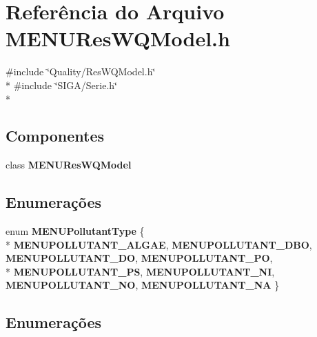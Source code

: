 \section{Referência do Arquivo M\+E\+N\+U\+Res\+W\+Q\+Model.\+h}
\label{_m_e_n_u_res_w_q_model_8h}
{\ttfamily \#include \char`\"{}Quality/\+Res\+W\+Q\+Model.\+h\char`\"{}}\\*
{\ttfamily \#include \char`\"{}S\+I\+G\+A/\+Serie.\+h\char`\"{}}\\*
\subsection*{Componentes}
\begin{DoxyCompactItemize}
\item 
class {\bf M\+E\+N\+U\+Res\+W\+Q\+Model}
\end{DoxyCompactItemize}
\subsection*{Enumerações}
\begin{DoxyCompactItemize}
\item 
enum {\bf M\+E\+N\+U\+Pollutant\+Type} \{ \\*
{\bf M\+E\+N\+U\+P\+O\+L\+L\+U\+T\+A\+N\+T\+\_\+\+A\+L\+G\+AE}, 
{\bf M\+E\+N\+U\+P\+O\+L\+L\+U\+T\+A\+N\+T\+\_\+\+D\+BO}, 
{\bf M\+E\+N\+U\+P\+O\+L\+L\+U\+T\+A\+N\+T\+\_\+\+DO}, 
{\bf M\+E\+N\+U\+P\+O\+L\+L\+U\+T\+A\+N\+T\+\_\+\+PO}, 
\\*
{\bf M\+E\+N\+U\+P\+O\+L\+L\+U\+T\+A\+N\+T\+\_\+\+PS}, 
{\bf M\+E\+N\+U\+P\+O\+L\+L\+U\+T\+A\+N\+T\+\_\+\+NI}, 
{\bf M\+E\+N\+U\+P\+O\+L\+L\+U\+T\+A\+N\+T\+\_\+\+NO}, 
{\bf M\+E\+N\+U\+P\+O\+L\+L\+U\+T\+A\+N\+T\+\_\+\+NA}
 \}
\end{DoxyCompactItemize}


\subsection{Enumerações}
